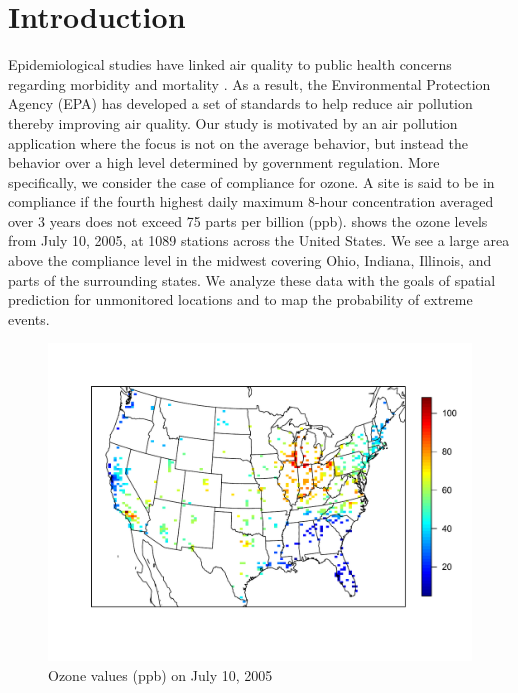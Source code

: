 \documentclass[useAMS,usenatbib,referee]{biom}
\begin{document}
\section{Introduction}\label{sts:intro}
Epidemiological studies have linked air quality to public health concerns regarding morbidity and mortality \citep{Samet2000}.
As a result, the Environmental Protection Agency (EPA) has developed a set of standards to help reduce air pollution thereby improving air quality.
Our study is motivated by an air pollution application where the focus is not on the average behavior, but instead the behavior over a high level determined by government regulation.
More specifically, we consider the case of compliance for ozone.
A site is said to be in compliance if the fourth highest daily maximum 8-hour concentration averaged over 3 years does not exceed 75 parts per billion (ppb).
 shows the ozone levels from July 10, 2005, at 1089 stations across the United States.
We see a large area above the compliance level in the midwest covering Ohio, Indiana, Illinois, and parts of the surrounding states.
We analyze these data with the goals of spatial prediction for unmonitored locations and to map the probability of extreme events.

\begin{figure}[h!tbp]
  \centering
  \includegraphics[width=0.75\linewidth]{plots/ozone-10jul-us.pdf}
  \caption{Ozone values (ppb) on July 10, 2005}
  \label{stfig:ozone-10jul}
\end{figure}
\end{document}

